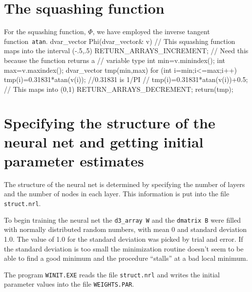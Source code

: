 \documentclass[12pt]{book}
\begin{document}
\section{The squashing function}
For the squashing function, $\Phi$, we have employed the inverse tangent 
function~{\tt atan}.
\beginexample 
dvar_vector Phi(dvar_vector& v)
{
  // This squashing function maps into the interval (-.5,.5)
  RETURN_ARRAYS_INCREMENT;  // Need this because the function returns a 
                            // variable type
  int min=v.minindex();
  int max=v.maxindex();
  dvar_vector tmp(min,max)
  for (int i=min;i<=max;i++)
  {
    tmp(i)=0.31831*atan(v(i)); //0.31831 is 1/PI 
    // tmp(i)=0.31831*atan(v(i))+0.5; // This maps into (0,1) 
  }
  RETURN_ARRAYS_DECREMENT; 
  return(tmp);
}
\endexample
\section{Specifying the structure of the neural net and getting initial parameter estimates}

The structure of the neural net is determined by specifying the number of
layers and the number of nodes in each layer. This information
is put into the file {\tt struct.nrl}.

To begin training the neural net the {\tt d3\_array W} and the
{\tt dmatrix B} were filled with normally distributed random numbers,
with mean 0 and standard deviation 1.0.  The value of 1.0 for the standard
deviation was picked by trial and error. If the standard deviation is
too small the minimization routine doesn't seem to be able to find 
a good minimum and the procedure ``stalls'' at a bad local minimum.

The program {\tt WINIT.EXE} reads the file {\tt struct.nrl} and
writes the initial parameter values into the file {\tt WEIGHTS.PAR}.  
 
\end{document}
